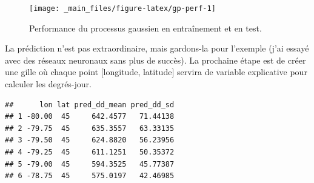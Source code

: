 \documentclass[]{book}
\newenvironment{Shaded}{\begin{snugshade}}{\end{snugshade}}
\newcommand{\DataTypeTok}[1]{\textcolor[rgb]{0.13,0.29,0.53}{#1}}
\newcommand{\DecValTok}[1]{\textcolor[rgb]{0.00,0.00,0.81}{#1}}
\newcommand{\FloatTok}[1]{\textcolor[rgb]{0.00,0.00,0.81}{#1}}
\newcommand{\KeywordTok}[1]{\textcolor[rgb]{0.13,0.29,0.53}{\textbf{#1}}}
\newcommand{\NormalTok}[1]{#1}
\newcommand{\OperatorTok}[1]{\textcolor[rgb]{0.81,0.36,0.00}{\textbf{#1}}}
\newcommand{\StringTok}[1]{\textcolor[rgb]{0.31,0.60,0.02}{#1}}
\begin{document}
\begin{figure}

{\centering \texttt{[image: \_main\_files/figure-latex/gp-perf-1]} 

}

\caption{Performance du processus gaussien en entraînement et en test.}\label{fig:gp-perf}
\end{figure}

La prédiction n'est pas extraordinaire, mais gardons-la pour l'exemple
(j'ai essayé avec des réseaux neuronaux sans plus de succès). La
prochaine étape est de créer une gille où chaque point {[}longitude,
latitude{]} servira de variable explicative pour calculer les
degrés-jour.

\begin{Shaded}
\end{Shaded}

\begin{verbatim}
##      lon lat pred_dd_mean pred_dd_sd
## 1 -80.00  45     642.4577   71.44138
## 2 -79.75  45     635.3557   63.33135
## 3 -79.50  45     624.8820   56.23956
## 4 -79.25  45     611.1251   50.35372
## 5 -79.00  45     594.3525   45.77387
## 6 -78.75  45     575.0197   42.46985
\end{verbatim}
\end{document}
